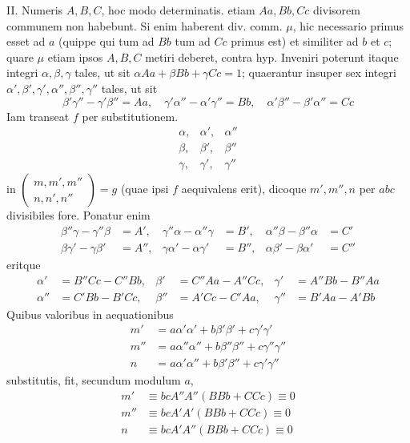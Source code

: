 II. Numeris \(A,B,C\), hoc modo determinatis. etiam \(Aa,Bb,Cc\) divisorem communem non habebunt. Si enim haberent div. comm. \(\mu\), hic necessario primus esset ad \(a\) (quippe qui tum ad \(Bb\) tum ad \(Cc\) primus est) et similiter ad
\(b\) et \(c\); quare \(\mu\) etiam ipsos \(A,B,C\) metiri deberet, contra hyp. Inveniri poterunt itaque integri \(\alpha,\beta,\gamma\) tales, ut sit \(\alpha Aa+\beta Bb+\gamma Cc=1\); quaerantur insuper sex integri \(\alpha',\beta',\gamma',\alpha'',\beta'',\gamma''\) tales, ut sit
\[
\beta'\gamma''-\gamma'\beta''=Aa,\quad
\gamma'\alpha''-\alpha'\gamma''=Bb,\quad
\alpha'\beta''-\beta'\alpha''=Cc
\]
Iam transeat \(f\) per substitutionem.
\[
\begin{array}{ccc}
\alpha,&\alpha',&\alpha''\\
\beta,&\beta',&\beta''\\
\gamma,&\gamma',&\gamma''
\end{array}
\]
in \(\left(\begin{smallmatrix}m,m',m''\\n,n',n''\end{smallmatrix}\right)=g\) (quae ipsi \(f\) aequivalens erit), dicoque \(m',m'',n\) per \(abc\) divisibiles fore. Ponatur enim
\[
\begin{aligned}
\beta''\gamma-\gamma''\beta&=A',&\gamma''\alpha-\alpha''\gamma&=B',&\alpha''\beta-\beta''\alpha&=C'\\
\beta\gamma'-\gamma\beta'&=A'',&\gamma\alpha'-\alpha\gamma'&=B'',&\alpha\beta'-\beta\alpha'&=C''
\end{aligned}
\]
eritque
\[
\begin{aligned}
\alpha'&=B''Cc-C''Bb,&\beta'&=C''Aa-A''Cc,&\gamma'&=A''Bb-B''Aa\\
\alpha''&=C'Bb-B'Cc,&\beta''&=A'Cc-C'Aa,&\gamma''&=B'Aa-A'Bb
\end{aligned}
\]
Quibus valoribus in aequationibus
\[
\begin{aligned}
m'&=a\alpha'\alpha'+b\beta'\beta'+c\gamma'\gamma'\\
m''&=a\alpha''\alpha''+b\beta''\beta''+c\gamma''\gamma''\\
n&=a\alpha'\alpha''+b\beta'\beta''+c\gamma'\gamma''
\end{aligned}
\]
substitutis, fit, secundum modulum \(a\),
\[
\begin{aligned}
m'&\equiv bcA''A''(BBb+CCc)\equiv0\\
m''&\equiv bcA'A'(BBb+CCc)\equiv0\\
n&\equiv bcA'A''(BBb+CCc)\equiv0
\end{aligned}
\]
